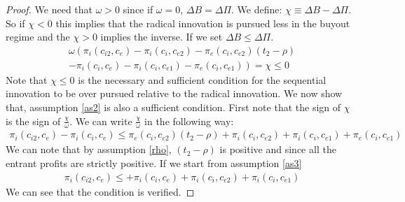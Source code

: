 \begin{proof}
We need that $\omega>0$ since if $\omega=0$, $\Delta B= \Delta \Pi$. We define: $ \chi \equiv \Delta B - \Delta \Pi $. So if $\chi<0$ this implies that the radical innovation is pursued less in the buyout regime and the $\chi>0$ implies the inverse. If we set $\Delta B \leq \Delta \Pi $.  
\begin{align*}
\omega \left(  \pi_{i}(c_{i2},c_{e})- \pi_{i}(c_{i},c_{e2})-\pi_{e}(c_{i},c_{e2})  \left( t_2- \rho \right) \right. \\
-\left.\pi_i(c_i,c_{e})-\pi_i(c_i,c_{e1})-\pi_e(c_i,c_{e1}) \right) = \chi \leq 0 
\end{align*}
Note that $\chi \leq 0$ is the necessary and sufficient condition for the sequential innovation to be over pursued relative to the radical innovation. We now show that, assumption \ref{as2} is also a sufficient condition. First note that the sign of $\chi$ is the sign of $\frac{\chi}{\omega}$. We can write $\frac{\chi}{\omega}$ in the following way: 
\begin{align*}
\pi_{i}(c_{i2},c_{e})-  \pi_i(c_i,c_{e})\leq \pi_{e}(c_{i},c_{e2})  \left( t_2- \rho \right) +
\pi_{i}(c_{i},c_{e2}) +\pi_i(c_i,c_{e1})+\pi_e(c_i,c_{e1}) 
\end{align*}
We can note that by assumption \ref{rho}, $\left( t_2- \rho \right)$ is positive and since all the entrant profits are strictly positive. If we start from assumption \ref{as3}
\begin{align*}
\pi_{i}(c_{i2},c_{e}) \leq +\pi_i(c_i,c_{e})+
\pi_{i}(c_{i},c_{e2}) +\pi_i(c_i,c_{e1})
\end{align*}
We can see that the condition is verified. 




\end{proof}
